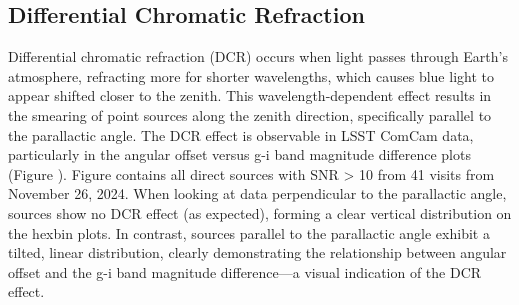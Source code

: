 \subsection{Differential Chromatic Refraction}
\label{sec:diffeerential_chromatic_refraction}

Differential chromatic refraction (DCR) occurs when light passes through Earth’s atmosphere, refracting more for shorter wavelengths, which causes blue light to appear shifted closer to the zenith. This wavelength-dependent effect results in the smearing of point sources along the zenith direction, specifically parallel to the parallactic angle. The DCR effect is observable in LSST ComCam data, particularly in the angular offset versus g-i band magnitude difference plots (Figure ). Figure  contains all direct sources with SNR > 10 from 41 visits from November 26, 2024. When looking at data perpendicular to the parallactic angle, sources show no DCR effect (as expected), forming a clear vertical distribution on the hexbin plots. In contrast, sources parallel to the parallactic angle exhibit a tilted, linear distribution, clearly demonstrating the relationship between angular offset and the g-i band magnitude difference—a visual indication of the DCR effect.

